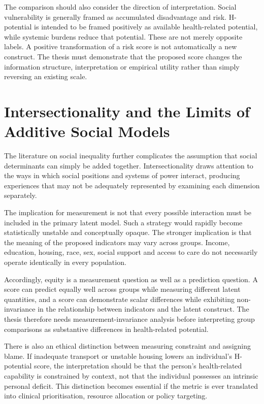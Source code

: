 The comparison should also consider the direction of interpretation. Social vulnerability is generally framed as accumulated disadvantage and risk. H-potential is intended to be framed positively as available health-related potential, while systemic burdens reduce that potential. These are not merely opposite labels. A positive transformation of a risk score is not automatically a new construct. The thesis must demonstrate that the proposed score changes the information structure, interpretation or empirical utility rather than simply reversing an existing scale.

\section{Intersectionality and the Limits of Additive Social Models}

The literature on social inequality further complicates the assumption that social determinants can simply be added together. Intersectionality draws attention to the ways in which social positions and systems of power interact, producing experiences that may not be adequately represented by examining each dimension separately. \cite{crenshaw_1991,bowleg_2008}

The implication for measurement is not that every possible interaction must be included in the primary latent model. Such a strategy would rapidly become statistically unstable and conceptually opaque. The stronger implication is that the meaning of the proposed indicators may vary across groups. Income, education, housing, race, sex, social support and access to care do not necessarily operate identically in every population.

Accordingly, equity is a measurement question as well as a prediction question. A score can predict equally well across groups while measuring different latent quantities, and a score can demonstrate scalar differences while exhibiting non-invariance in the relationship between indicators and the latent construct. The thesis therefore needs measurement-invariance analysis before interpreting group comparisons as substantive differences in health-related potential.

There is also an ethical distinction between measuring constraint and assigning blame. If inadequate transport or unstable housing lowers an individual's H-potential score, the interpretation should be that the person's health-related capability is constrained by context, not that the individual possesses an intrinsic personal deficit. This distinction becomes essential if the metric is ever translated into clinical prioritisation, resource allocation or policy targeting.

